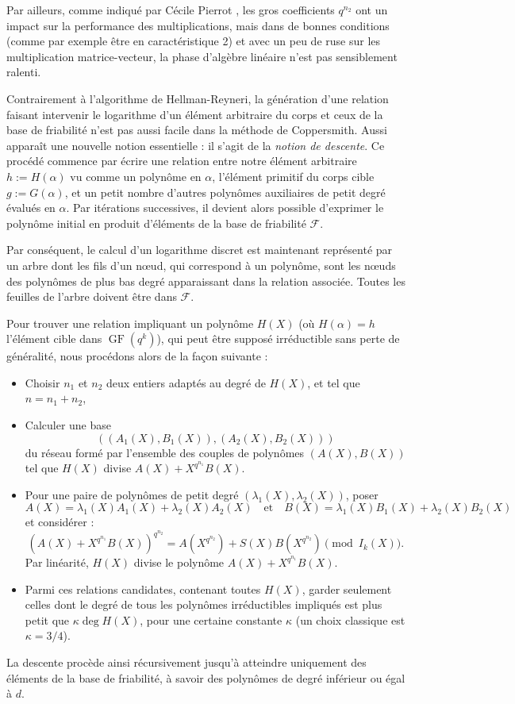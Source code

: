 \documentclass[a4paper, titlepage, 11pt]{article}
\theoremstyle{definition}
\theoremstyle{remark}
\def\gf{\operatorname{GF}}
\begin{document}
Par ailleurs, comme indiqué par Cécile Pierrot \cite{pierrot2016}, les gros coefficients $q^{n_2}$ ont un impact sur la performance des multiplications, mais dans de bonnes conditions (comme par exemple être en caractéristique 2) et avec un peu de ruse sur les multiplication matrice-vecteur, la phase d'algèbre linéaire n'est pas sensiblement ralenti.

Contrairement à l'algorithme de Hellman-Reyneri, la génération d'une relation faisant intervenir le logarithme d'un élément arbitraire du corps et ceux de la base de friabilité n'est pas aussi facile dans la méthode de Coppersmith. Aussi apparaît une nouvelle notion essentielle : il s'agit de la \textit{notion de descente}. Ce procédé commence par écrire une relation entre notre élément arbitraire $h := H(\alpha)$ vu comme un polynôme en $\alpha$, l'élément primitif du corps cible $g := G(\alpha)$, et un petit nombre d'autres polynômes auxiliaires de petit degré évalués en $\alpha$. Par itérations successives, il devient alors possible d'exprimer le polynôme initial en produit d'éléments de la base de friabilité $\mathcal{F}$.

Par conséquent, le calcul d'un logarithme discret est maintenant représenté par un arbre dont les fils d'un n\oe ud, qui correspond à un polynôme, sont les n\oe uds des polynômes de plus bas degré apparaissant dans la relation associée. Toutes les feuilles de l'arbre doivent être dans $\mathcal{F}$.

Pour trouver une relation impliquant un polynôme $H(X)$ (où $H(\alpha) = h$ l'élément cible dans $\gf(q^k)$), qui peut être supposé irréductible sans perte de généralité, nous procédons alors de la façon suivante : \begin{itemize}
\item Choisir $n_1$ et $n_2$ deux entiers adaptés au degré de $H(X)$, et tel que $n = n_1 + n_2$,
\item Calculer une base $$((A_1(X), B_1(X)), (A_2(X), B_2(X)))$$ du réseau formé par l'ensemble des couples de polynômes $(A(X),B(X))$ tel que $H(X)$ divise $A(X) + X^{q^{n_1}}B(X)$.
\item Pour une paire de polynômes de petit degré $(\lambda_1(X), \lambda_2(X))$, poser 
$$A(X) = \lambda_1(X)A_1(X) + \lambda_2(X)A_2(X) \quad\text{et}\quad B(X) = \lambda_1(X)B_1(X) + \lambda_2(X)B_2(X)$$ et considérer :
$${\left( A(X) + X^{q^{n_1}}B(X)\right)}^{q^{n_2}} = A(X^{q^{n_2}}) + S(X)B(X^{q^{n_2}}) \pmod{I_k(X)}.$$
Par linéarité, $H(X)$ divise le polynôme $A(X) + X^{q^{n_1}}B(X)$.
\item Parmi ces relations candidates, contenant toutes $H(X)$, garder seulement celles dont le degré de tous les polynômes irréductibles impliqués est plus petit que $\kappa \deg H(X)$, pour une certaine constante $\kappa$ (un choix classique est $\kappa = 3/4$).
\end{itemize}
La descente procède ainsi récursivement jusqu'à atteindre uniquement des éléments de la base de friabilité, à savoir des polynômes de degré inférieur ou égal à $d$.
\end{document}
